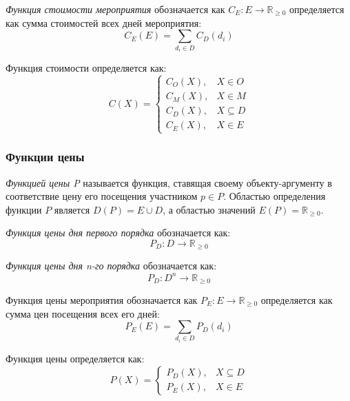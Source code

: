 \textit{Функция стоимости мероприятия} обозначается как $C_E: E \rightarrow \mathbb{R}_{\ge 0}$ определяется как сумма стоимостей всех дней мероприятия:
\begin{equation}
	C_E(E) = \sum_{d_i \in D} C_D(d_i)
	\label{eq:cost-event}
\end{equation}

Функция стоимости определяется как:
\begin{equation}
	C(X) = 
	\begin{cases}
		C_O(X), & X \in O \\
		C_M(X), & X \in M \\
		C_D(X), & X \subseteq D \\
		C_E(X), & X \in E
	\end{cases}
\end{equation}

\subsubsection{Функции цены}

\textit{Функцией цены P} называется функция, ставящая своему объекту-аргументу в соответствие цену его посещения участником $p \in P$. Областью определения функции $P$ является $D(P) = E \cup D$, а областью значений $E(P) = \mathbb{R}_{\ge 0}$.

\textit{Функция цены дня первого порядка} обозначается как:
\begin{equation}
	P_D: D \rightarrow \mathbb{R}_{\ge 0}
\end{equation}

\textit{Функция цены дня n-го порядка} обозначается как:
\begin{equation}
	P_D: D^n \rightarrow \mathbb{R}_{\ge 0}
\end{equation}

Функция цены мероприятия обозначается как $P_E: E \rightarrow \mathbb{R}_{\ge 0}$ определяется как сумма цен посещения всех его дней:
\begin{equation}
	P_E(E) = \sum_{d_i \in D}{P_D(d_i)}
\end{equation}

Функция цены определяется как:
\begin{equation}
	P(X) = 
	\begin{cases}
		P_D(X), & X \subseteq D \\
		P_E(X), & X \in E
	\end{cases}
\end{equation}

